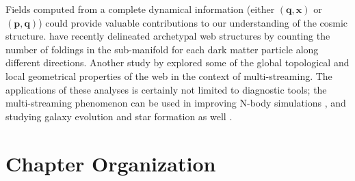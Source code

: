 Fields computed from a complete dynamical information (either $(\mathbf{q}, \mathbf{x})$ or $(\mathbf{p}, \mathbf{q})$) could provide valuable contributions to our understanding of the cosmic structure. \cite{Falck2012} have recently delineated archetypal web structures by counting the number of foldings in the sub-manifold for each dark matter particle along different directions. Another study by \cite{Ramachandra2016a} explored some of the global topological and local geometrical properties of the web in the context of multi-streaming. The applications of these analyses is certainly not limited to diagnostic tools; the multi-streaming phenomenon can be used in improving N-body simulations \citep{Hahn2013}, and studying galaxy evolution and star formation as well \citep{Aragon-Calvo2016b}. 

\section{Chapter Organization}